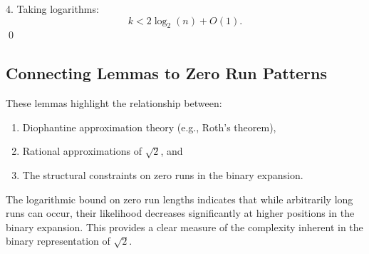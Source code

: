 4. Taking logarithms:
\[
k < 2 \log_2(n) + O(1).
\] \qed

\subsection{Connecting Lemmas to Zero Run Patterns}
These lemmas highlight the relationship between:
\begin{enumerate}
    \item Diophantine approximation theory (e.g., Roth's theorem),
    \item Rational approximations of $\sqrt{2}$, and
    \item The structural constraints on zero runs in the binary expansion.
\end{enumerate}

The logarithmic bound on zero run lengths indicates that while arbitrarily long runs can occur, their likelihood decreases significantly at higher positions in the binary expansion. This provides a clear measure of the complexity inherent in the binary representation of $\sqrt{2}$.
